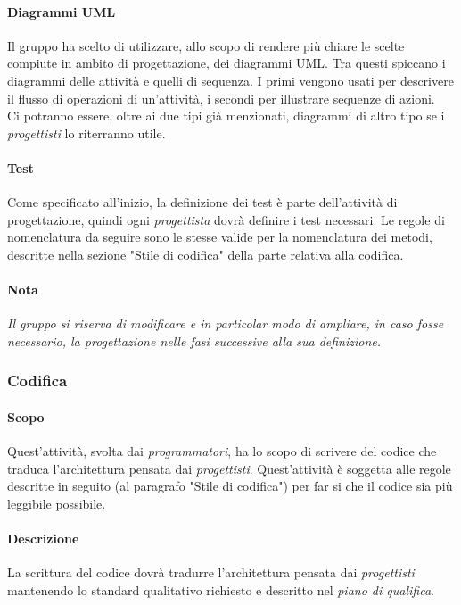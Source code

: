 \documentclass[../norme_di_progetto.tex]{subfiles}
\begin{document}
    \paragraph{Diagrammi UML}
    Il gruppo ha scelto di utilizzare, allo scopo di rendere più chiare le scelte compiute in ambito di progettazione, dei diagrammi UML. Tra questi spiccano i diagrammi delle attività e quelli di sequenza. I primi vengono usati per descrivere il flusso di operazioni di un'attività, i secondi per illustrare sequenze di azioni.\\
    Ci potranno essere, oltre ai due tipi già menzionati, diagrammi di altro tipo se i \emph{progettisti} lo riterranno utile.


    \paragraph{Test}
    Come specificato all'inizio, la definizione dei test è parte dell'attività di progettazione, quindi ogni \emph{progettista} dovrà definire i test necessari. Le regole di nomenclatura da seguire sono le stesse valide per la nomenclatura dei metodi, descritte nella sezione "Stile di codifica" della parte relativa alla codifica.

    \paragraph{Nota}
    \emph{Il gruppo si riserva di modificare e in particolar modo di ampliare, in caso fosse necessario, la progettazione nelle fasi successive alla sua definizione.}

\subsubsection{Codifica}
 
    \paragraph{Scopo}
    Quest'attività, svolta dai \emph{programmatori}, ha lo scopo di scrivere del codice che traduca l'architettura pensata dai \emph{progettisti}. Quest'attività è soggetta alle regole descritte in seguito (al paragrafo "Stile di codifica") per far si che il codice sia più leggibile possibile.

    \paragraph{Descrizione}
    La scrittura del codice dovrà tradurre l'architettura pensata dai \emph{progettisti} mantenendo lo standard qualitativo richiesto e descritto nel \emph{piano di qualifica}.
\end{document}
